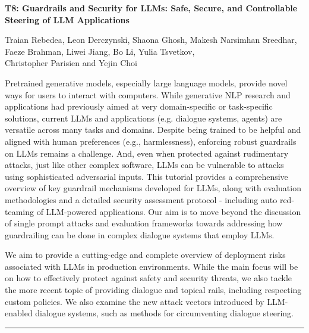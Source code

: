 \begin{center}
    \Large{\textbf{T8: Guardrails and Security for LLMs: Safe, Secure, and Controllable Steering of LLM Applications}\\}
    \par\bigskip
    \large{Traian Rebedea, Leon Derczynski, Shaona Ghosh, Makesh Narsimhan Sreedhar,
Faeze Brahman, Liwei Jiang, Bo Li, Yulia Tsvetkov, \\
Christopher Parisien and Yejin Choi}\\
    \par\bigskip

\end{center}

Pretrained generative models, especially large language models, provide novel ways for users to interact with computers. While generative NLP research and applications had previously aimed at very domain-specific or task-specific solutions, current LLMs and applications (e.g. dialogue systems, agents) are versatile across many tasks and domains. Despite being trained to be helpful and aligned with human preferences (e.g., harmlessness), enforcing robust guardrails on LLMs remains a challenge. And, even when protected against rudimentary attacks, just like other complex software, LLMs can be vulnerable to attacks using sophisticated adversarial inputs. This tutorial provides a comprehensive overview of key guardrail mechanisms developed for LLMs, along with evaluation methodologies and a detailed security assessment protocol - including auto red-teaming of LLM-powered applications. Our aim is to move beyond the discussion of single prompt attacks and evaluation frameworks towards addressing how guardrailing can be done in complex dialogue systems that employ LLMs.

We aim to provide a cutting-edge and complete overview of deployment risks associated with LLMs in production environments. While the main focus will be on how to effectively protect against safety and security threats, we also tackle the more recent topic of providing dialogue and topical rails, including respecting custom policies. We also examine the new attack vectors introduced by LLM-enabled dialogue systems, such as methods for circumventing dialogue steering.
\begin{center}
    \noindent\rule{200px}{1pt}
\end{center}
